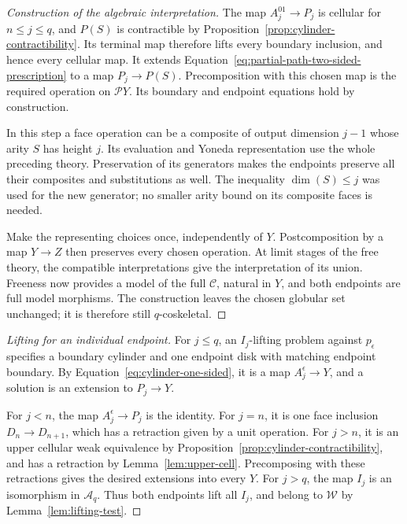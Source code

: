 \documentclass[11pt,letterpaper]{article}
\numberwithin{equation}{section}
\theoremstyle{plain}
\theoremstyle{definition}
\theoremstyle{remark}
\begin{document}
\begin{proof}[Construction of the algebraic interpretation]
The map \(A_j^{01}\to P_j\) is cellular for
\(n\le j\le q\), and \(P(S)\) is contractible by
Proposition~\ref{prop:cylinder-contractibility}.  Its terminal map
therefore lifts every boundary inclusion, and hence every cellular map.
It extends Equation~\eqref{eq:partial-path-two-sided-prescription} to
a map \(P_j\to P(S)\).  Precomposition with this chosen map is
the required operation on \(\mathcal P Y\).  Its boundary and
endpoint equations hold by construction.

In this step a face operation can be a composite of output dimension
\(j-1\) whose arity \(S\) has height \(j\).  Its evaluation
and Yoneda representation use the whole preceding theory.  Preservation
of its generators makes the endpoints preserve all their composites
and substitutions as well.  The inequality \(\dim(S)\le j\)
was used for the new generator; no smaller arity bound on its composite
faces is needed.

Make the representing choices once, independently of \(Y\).
Postcomposition by a map \(Y\to Z\) then preserves every
chosen operation.  At limit stages of the free theory, the compatible
interpretations give the interpretation of its union.  Freeness now
provides a model of the full \(\mathcal C\), natural in \(Y\),
and both endpoints are full model morphisms.  The construction leaves
the chosen globular set unchanged; it is therefore still
\(q\)-coskeletal.
\end{proof}

\begin{proof}[Lifting for an individual endpoint]
For \(j\le q\), an \(I_j\)-lifting problem against
\(p_\epsilon\) specifies a boundary cylinder and one endpoint
disk with matching endpoint boundary.  By
Equation~\eqref{eq:cylinder-one-sided}, it is a map
\(A_j^\epsilon\to Y\), and a solution is an extension to
\(P_j\to Y\).

For \(j<n\), the map \(A_j^\epsilon\to P_j\) is the
identity.  For \(j=n\), it is one face inclusion
\(D_n\to D_{n+1}\), which has a retraction given by a unit
operation.  For \(j>n\), it is an upper cellular weak equivalence
by Proposition~\ref{prop:cylinder-contractibility}, and has a
retraction by Lemma~\ref{lem:upper-cell}.  Precomposing with these
retractions gives the desired extensions into every \(Y\).
For \(j>q\), the map \(I_j\) is an isomorphism in
\(\mathcal A_q\).  Thus both endpoints lift all \(I_j\),
and belong to \(\mathcal W\) by Lemma~\ref{lem:lifting-test}.
\end{proof}
\end{document}
